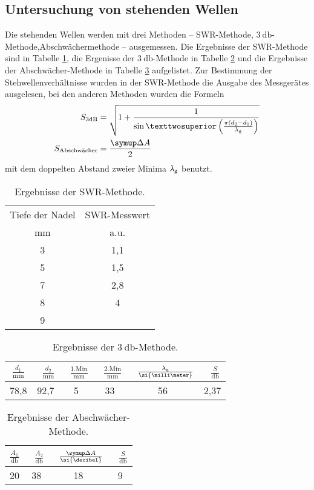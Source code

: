 \subsection{Untersuchung von stehenden Wellen}
Die stehenden Wellen werden mit drei Methoden -- SWR-Methode, $\SI{3}{\decibel}$-Methode,Abschwächermethode -- ausgemessen. 
Die Ergebnisse der SWR-Methode sind in Tabelle \ref{tab:swr_methode}, die Ergenisse der $\SI{3}{\decibel}$-Methode in Tabelle \ref{tab:3dB} und die Ergebnisse der Abschwächer-Methode in Tabelle \ref{tab:Abschwaecher} aufgelistet.
Zur Bestimmung der Stehwellenverhältnisse wurden in der SWR-Methode die Ausgabe des Messgerätes ausgelesen, bei den anderen Methoden wurden die Formeln
\begin{align}
	S_\text{3dB}&=\sqrt{1+\frac{1}{\sin²\left(\frac{\pi(d_2-d_1)}{\lambda_\text g}\right)}}\\
	S_\text{Abschwächer}&=\frac{\symup\Delta A}{2}
\end{align}
mit dem doppelten Abstand zweier Minima $\lambda_\text g$ benutzt.
\begin{table}
\centering
\caption{Ergebnisse der SWR-Methode.}
\begin{tabular}{cc}
	\toprule
	Tiefe der Nadel& SWR-Messwert\\
	\si{\milli\meter}& a.u.\\
	\midrule
	3& 1,1\\
	5& 1,5\\
	7& 2,8\\
	8& 4\\
	9& \infty \\
	\bottomrule
\end{tabular}
\label{tab:swr_methode}
\end{table}
\begin{table}
\centering
\caption{Ergebnisse der $\SI{3}{\decibel}$-Methode.}
\begin{tabular}{cccccc}
	\toprule
	$\frac{d_1}{\si{\milli\meter}}$& \
	$\frac{d_2}{\si{\milli\meter}}$& \
	$\frac{\text{1.Min}}{\si{\milli\meter}}$& \
	$\frac{\text{2.Min}}{\si{\milli\meter}}$& \
	$\frac{\lambda_\text g}{\si{\milli\meter}}$& \
	$\frac{S}{\si{\decibel}}$\\
	\midrule
	78,8&	92,7&	5&	33& 56&	2,37\\
	\bottomrule
\end{tabular}
\label{tab:3dB}
\end{table}
\begin{table}
\centering
\caption{Ergebnisse der Abschwächer-Methode.}
\begin{tabular}{cccc}
	\toprule
	$\frac{A_1}{\si{\decibel}}$& \
	$\frac{A_2}{\si{\decibel}}$& \	
	$\frac{\symup\Delta A}{\si{\decibel}}$& \	
	$\frac{S}{\si{\decibel}}$\\
	\midrule
	20&	38&	18&	9\\
	\bottomrule
\end{tabular}
\label{tab:Abschwaecher}
\end{table}